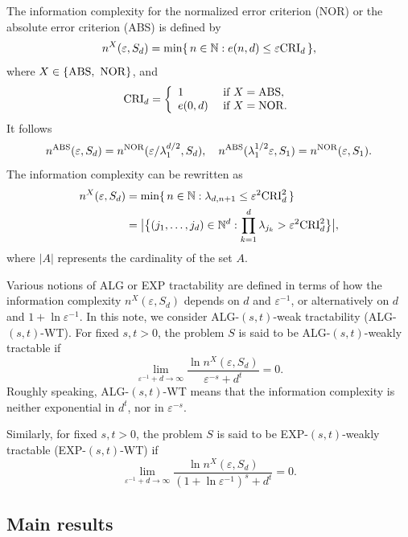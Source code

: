 \documentclass{amsart}
\numberwithin{equation}{section}
\def\vz{\varepsilon}
\def\lz{\lambda}
\newcommand{\NN}{\mathbb{N}}
\def\NN{{\mathbb N}}
\begin{document}
 The information complexity for the normalized error criterion  (NOR)
or the absolute error criterion (ABS) is defined by
\begin{equation*}
n^X(\vz,S_{d})=
\min\{\,n\in \NN : e(n,d) \le  \varepsilon {\rm CRI}_d\,\},
\end{equation*}
where $X\in\{{\rm ABS,\ NOR}\}$, and
$${\rm CRI}_d=\left\{
\begin{array}{ll}
1 & \mbox{ if } X={\rm ABS},\\
e(0,d) & \mbox{ if } X={\rm NOR}.
\end{array}\right.$$
 It follows
$$n^{\rm ABS}(\vz,S_d)=n^{\rm NOR}({\vz}/{\lz_1^{d/2}},S_d),\ \ \ n^{\rm ABS}(\lz_1^{1/2}\vz,S_1)=n^{\rm NOR}(\vz,S_1).$$
 The information complexity can be rewritten
as
\begin{align}\label{1.1}
n^X(\vz,S_{d})&=\min\{\,n\in \NN : \lambda_{d,n+1}\le  \varepsilon^2 {\rm CRI}^2_d\,\}\notag\\
&= \big|\big\{(j_1,\dots,j_d) \in \NN^d : \prod_{k=1}^d\lz_{j_k}>
\varepsilon^2 {\rm CRI}^2_d \big\}\big|,
\end{align}where $| A |$
represents the cardinality of the set $A$.

Various notions of ALG or EXP tractability  are defined in terms
of how the information complexity $n^X(\vz,S_{d})$ depends on $d$
and $\vz^{-1}$, or alternatively on $d$ and $1+\ln \vz^{-1}$.  In
this note, we consider ALG-$(s,t)$-weak tractability
(ALG-$(s,t)$-WT). For fixed $s, t> 0$, the problem $S$ is said to
be ALG-$(s,t)$-weakly tractable
 if
\begin{equation*}
\lim\limits_{\varepsilon^{-1} + d \to \infty} \frac{\ln
n^{X}(\varepsilon, S_d)}{\varepsilon^{-s}+d^t} = 0.
\end{equation*}
Roughly speaking,  ALG-$(s, t)$-WT means that  the information
complexity is neither exponential in $d^t$, nor in $\vz^{-s}$.

Similarly, for fixed  $s, t> 0$, the problem $S$ is said to be
EXP-$(s,t)$-weakly tractable (EXP-$(s,t)$-WT) if
\begin{equation*}
\lim\limits_{\varepsilon^{-1} + d \to \infty} \frac{\ln
n^{X}(\varepsilon, S_d)}{(1+\ln\varepsilon^{-1})^s +d^t} = 0.
\end{equation*}






\subsection{Main results}\label{Main Results}
\end{document}
